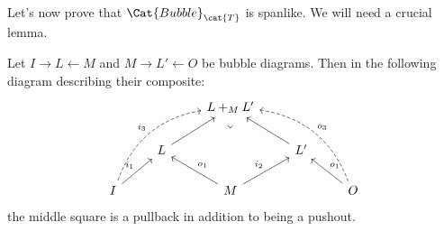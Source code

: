 \documentclass[DynamicalBook]{subfiles}
\begin{document}
Let's now prove that $\Cat{Bubble}_{\cat{T}}$ is spanlike. We will need a crucial lemma.
\begin{lemma}\label{lem:pushout.also.pullback}
  Let $I \rightarrow L \leftarrow M$ and $M \rightarrow L' \leftarrow O$ be bubble diagrams. Then in the following diagram describing their composite:
\[
\begin{tikzcd}
	&& {{L +_M L'}} \\
	& {L} && {{L'}} \\
	{{I}} && {{M}} && {{O}}
	\arrow[from=2-2, to=3-1, "i_{1}"', leftarrow]
	\arrow[from=2-2, to=3-3, "o_{1}", leftarrow]
	\arrow[from=2-4, to=3-3, "i_{2}"', leftarrow]
	\arrow[from=1-3, to=2-2, leftarrow]
	\arrow[from=1-3, to=2-4, leftarrow]
	\arrow[from=2-4, to=3-5, "o_{1}", leftarrow]
	\arrow["\lrcorner"{anchor=center, pos=0.125, rotate=-45}, draw=none, from=1-3, to=3-3]
	\arrow[bend right = 30, dashed, from=1-3, to=3-1, "i_{3}"', leftarrow]
	\arrow[bend left = 30, dashed, from=1-3, to=3-5, "o_{3}", leftarrow ]
\end{tikzcd}
\]
the middle square is a pullback in addition to being a pushout.
  \end{lemma}
\end{document}
